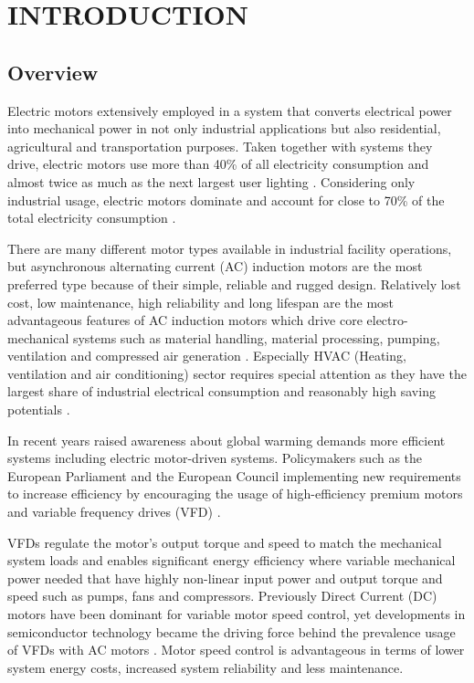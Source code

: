 \chapter{INTRODUCTION}\label{Ch1}
\section{Overview}
\label{overvıew}

Electric motors extensively employed in a system that converts electrical power into mechanical power in not only industrial applications but also residential, agricultural and transportation purposes. Taken together with systems they drive, electric motors use more than 40\% of all electricity consumption and almost twice as much as the next largest user lighting \cite{waide2011energy}. Considering only industrial usage, electric motors dominate and account for close to 70\% of the total electricity consumption \cite{waide2011energy,kulterer2014policy}.

There are many different motor types available in industrial facility operations, but asynchronous alternating current (AC) induction motors are the most preferred type because of their simple, reliable and rugged design. Relatively lost cost, low maintenance, high reliability and long lifespan are the most advantageous features of AC induction motors which drive core electro-mechanical systems such as material handling, material processing, pumping, ventilation and compressed air generation \cite{Fleiter2012EnergyEI}. Especially HVAC (Heating, ventilation and air conditioning) sector requires special attention as they have the largest share of industrial electrical consumption and reasonably high saving potentials \cite{Fleiter2012EnergyEI}.

In recent years raised awareness about global warming demands more efficient systems including electric motor-driven systems. Policymakers such as the European Parliament and the European Council implementing new requirements to increase efficiency by encouraging the usage of high-efficiency premium motors and variable frequency drives (VFD) \cite{kulterer2014policy,mikami2011historical}.

VFDs regulate the motor's output torque and speed to match the mechanical system loads and enables significant energy efficiency where variable mechanical power needed that have highly non-linear input power and output torque and speed such as pumps, fans and compressors. Previously Direct Current (DC) motors have been dominant for variable motor speed control, yet developments in semiconductor technology became the driving force behind the prevalence usage of VFDs with AC motors \cite{doe2008improving}. Motor speed control is advantageous in terms of lower system energy costs, increased system reliability and less maintenance.  

